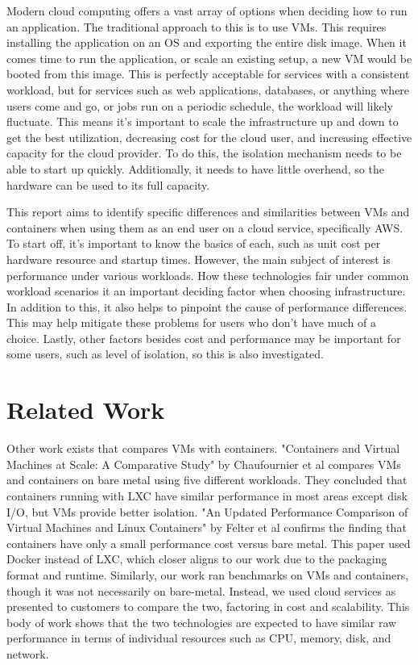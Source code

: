 \documentclass[11pt]{article}
\begin{document}
Modern cloud computing offers a vast array of options when deciding how to run an application. The traditional approach to this is to use VMs. This requires installing the application on an OS and exporting the entire disk image. When it comes time to run the application, or scale an existing setup, a new VM would be booted from this image. This is perfectly acceptable for services with a consistent workload, but for services such as web applications, databases, or anything where users come and go, or jobs run on a periodic schedule, the workload will likely fluctuate. This means it's important to scale the infrastructure up and down to get the best utilization, decreasing cost for the cloud user, and increasing effective capacity for the cloud provider. To do this, the isolation mechanism needs to be able to start up quickly. Additionally, it needs to have little overhead, so the hardware can be used to its full capacity.

This report aims to identify specific differences and similarities between VMs and containers when using them as an end user on a cloud service, specifically AWS. To start off, it's important to know the basics of each, such as unit cost per hardware resource and startup times. However, the main subject of interest is performance under various workloads. How these technologies fair under common workload scenarios it an important deciding factor when choosing infrastructure. In addition to this, it also helps to pinpoint the cause of performance differences. This may help mitigate these problems for users who don't have much of a choice. Lastly, other factors besides cost and performance may be important for some users, such as level of isolation, so this is also investigated.


\section{Related Work}

Other work exists that compares VMs with containers. "Containers and Virtual Machines at Scale: A Comparative Study" by Chaufournier et al compares VMs and containers on bare metal using five different workloads. They concluded that containers running with LXC have similar performance in most areas except disk I/O, but VMs provide better isolation. "An Updated Performance Comparison of Virtual Machines and Linux Containers" by Felter et al confirms the finding that containers have only a small performance cost versus bare metal. This paper used Docker instead of LXC, which closer aligns to our work due to the packaging format and runtime. Similarly, our work ran benchmarks on VMs and containers, though it was not necessarily on bare-metal. Instead, we used cloud services as presented to customers to compare the two, factoring in cost and scalability. This body of work shows that the two technologies are expected to have similar raw performance in terms of individual resources such as CPU, memory, disk, and network.
\end{document}
